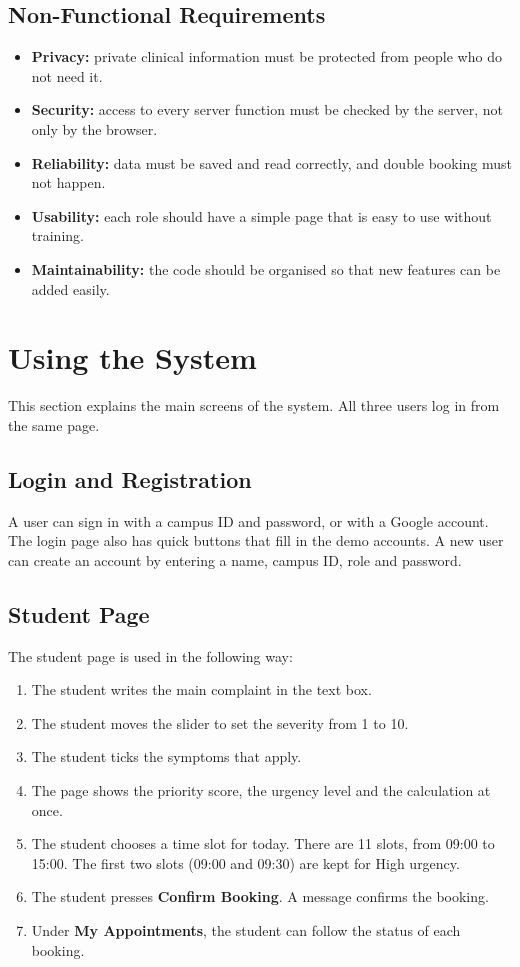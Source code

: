 \documentclass[12pt,a4paper]{article}
\begin{document}
\subsection{Non-Functional Requirements}
\begin{itemize}
  \item \textbf{Privacy:} private clinical information must be protected from people who do not need it.
  \item \textbf{Security:} access to every server function must be checked by the server, not only by the browser.
  \item \textbf{Reliability:} data must be saved and read correctly, and double booking must not happen.
  \item \textbf{Usability:} each role should have a simple page that is easy to use without training.
  \item \textbf{Maintainability:} the code should be organised so that new features can be added easily.
\end{itemize}

\section{Using the System}
This section explains the main screens of the system. All three users log in from the same page.

\subsection{Login and Registration}
A user can sign in with a campus ID and password, or with a Google account. The login page also has quick buttons that fill in the demo accounts. A new user can create an account by entering a name, campus ID, role and password.



\subsection{Student Page}
The student page is used in the following way:
\begin{enumerate}
  \item The student writes the main complaint in the text box.
  \item The student moves the slider to set the severity from 1 to 10.
  \item The student ticks the symptoms that apply.
  \item The page shows the priority score, the urgency level and the calculation at once.
  \item The student chooses a time slot for today. There are 11 slots, from 09:00 to 15:00. The first two slots (09:00 and 09:30) are kept for High urgency.
  \item The student presses \textbf{Confirm Booking}. A message confirms the booking.
  \item Under \textbf{My Appointments}, the student can follow the status of each booking.
\end{enumerate}
\end{document}
